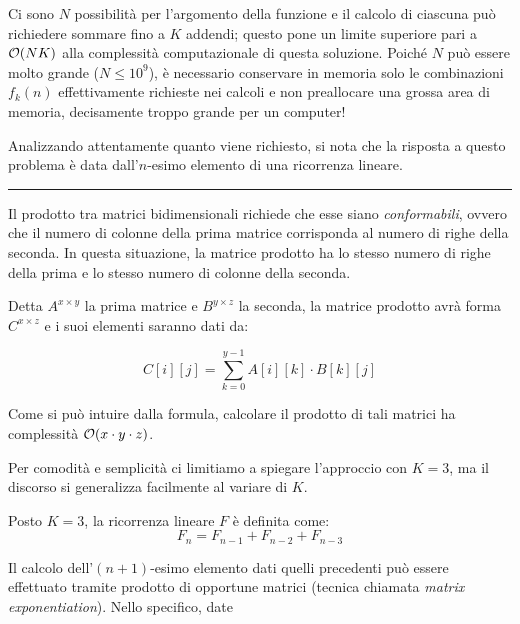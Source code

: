 \begin{solution}
Ci sono $N$ possibilità per l'argomento della funzione e il calcolo di ciascuna può richiedere sommare fino a $K$ addendi; questo pone un limite superiore pari a $\mathcal{O}(NK)$ alla complessità computazionale di questa soluzione. Poiché $N$ può essere molto grande ($N \le 10^9$), è necessario conservare in memoria solo le combinazioni $f_k(n)$ effettivamente richieste nei calcoli e non preallocare una grossa area di memoria, decisamente troppo grande per un computer!

\KKKlogN
Analizzando attentamente quanto viene richiesto, si nota che la risposta a questo problema è data dall'$n$-esimo elemento di una ricorrenza lineare.
\begin{mdframed}[style=tight]
	\begingroup
	\setlength{\fboxsep}{0pt}%
	\colorbox{black!50!white}{}
	\endgroup
	\hrule\vspace*{2mm}
	\hspace{.03\linewidth}
	\begin{minipage}{.94\linewidth}
Il prodotto tra matrici bidimensionali richiede che esse siano \emph{conformabili}, ovvero che il numero di colonne della prima matrice corrisponda al numero di righe della seconda. In questa situazione, la matrice prodotto ha lo stesso numero di righe della prima e lo stesso numero di colonne della seconda.

Detta $A^{x \times y}$ la prima matrice e $B^{y \times z}$ la seconda, la matrice prodotto avrà forma $C^{x \times z}$ e i suoi elementi saranno dati da:

$$C[i][j]=\sum_{k=0}^{y-1}A[i][k] \cdot B[k][j]$$

Come si può intuire dalla formula, calcolare il prodotto di tali matrici ha complessità $\mathcal{O}(x \cdot y \cdot z)$.
	\end{minipage}
\end{mdframed}

Per comodità e semplicità ci limitiamo a spiegare l'approccio con $K=3$, ma il discorso si generalizza facilmente al variare di $K$.

Posto $K=3$, la ricorrenza lineare $F$ è definita come: $$F_n=F_{n-1}+F_{n-2}+F_{n-3}$$

Il calcolo dell'$(n+1)$-esimo elemento dati quelli precedenti può essere effettuato tramite prodotto di opportune matrici (tecnica chiamata \emph{matrix exponentiation}). Nello specifico, date


\end{solution}
